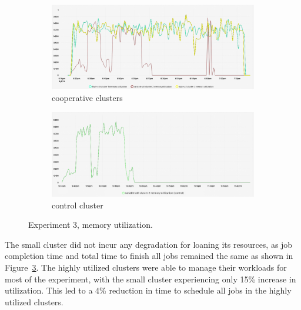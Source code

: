 \begin{figure}[H]
\centering
\begin{subfigure}{.5\textwidth}
  \centering
  \includegraphics[width=.9\linewidth]{./figures/experiment-three/exp-three-coop.png}
  \caption{cooperative clusters}
  \label{fig:exp3coop}
\end{subfigure}%
\begin{subfigure}{.5\textwidth}
  \centering
  \includegraphics[width=.9\linewidth]{./figures/experiment-three/exp-three-control.png}
  \caption{control cluster}
  \label{fig:exp3control}
\end{subfigure}
\caption{Experiment 3, memory utilization.}
\label{fig:exp3memutil}
\end{figure}

The small cluster did not incur any degradation for loaning its resources, as
job completion time and total time to finish all jobs remained the same as shown
in Figure~\ref{fig:exp3memutil}. The highly utilized clusters were able to manage their workloads for most of the
experiment, with the small cluster experiencing only 15\% increase in
utilization. This led to a  4\% reduction in time to schedule all jobs in the
highly utilized clusters. 

